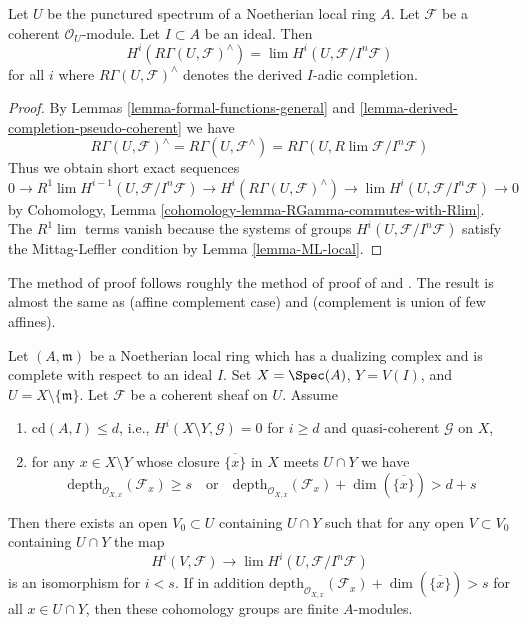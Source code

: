 \begin{lemma}
\label{lemma-compare-with-derived-completion}
Let $U$ be the punctured spectrum of a Noetherian local ring $A$.
Let $\mathcal{F}$ be a coherent $\mathcal{O}_U$-module.
Let $I \subset A$ be an ideal. Then
$$
H^i(R\Gamma(U, \mathcal{F})^\wedge) =
\lim H^i(U, \mathcal{F}/I^n\mathcal{F})
$$
for all $i$ where $R\Gamma(U, \mathcal{F})^\wedge$ denotes
the derived $I$-adic completion.
\end{lemma}

\begin{proof}
By Lemmas \ref{lemma-formal-functions-general} and
\ref{lemma-derived-completion-pseudo-coherent} we have
$$
R\Gamma(U, \mathcal{F})^\wedge =
R\Gamma(U, \mathcal{F}^\wedge) =
R\Gamma(U, R\lim \mathcal{F}/I^n\mathcal{F})
$$
Thus we obtain short exact sequences
$$
0 \to R^1\lim H^{i - 1}(U, \mathcal{F}/I^n\mathcal{F}) \to
H^i(R\Gamma(U, \mathcal{F})^\wedge) \to
\lim H^i(U, \mathcal{F}/I^n\mathcal{F}) \to 0
$$
by Cohomology, Lemma \ref{cohomology-lemma-RGamma-commutes-with-Rlim}.
The $R^1\lim$ terms vanish because the systems of groups
$H^i(U, \mathcal{F}/I^n\mathcal{F})$ satisfy the Mittag-Leffler condition
by Lemma \ref{lemma-ML-local}.
\end{proof}

\begin{theorem}
\label{theorem-algebraization-formal-sections}
\begin{reference}
The method of proof follows roughly the method of
proof of \cite[Theorem 1]{Faltings-algebraisation}
and \cite[Satz 2]{Faltings-uber}.
The result is almost the same as
\cite[Theorem 1.1]{MRaynaud-paper} (affine complement case) and
\cite[Theorem 3.9]{MRaynaud-book} (complement is union of few affines).
\end{reference}
Let $(A, \mathfrak m)$ be a Noetherian local ring which has a
dualizing complex and is complete with respect to an ideal $I$.
Set $X = \Spec(A)$, $Y = V(I)$, and $U = X \setminus \{\mathfrak m\}$.
Let $\mathcal{F}$ be a coherent sheaf on $U$.
Assume
\begin{enumerate}
\item $\text{cd}(A, I) \leq d$, i.e.,
$H^i(X \setminus Y, \mathcal{G}) = 0$ for $i \geq d$ and
quasi-coherent $\mathcal{G}$ on $X$,
\item for any $x \in X \setminus Y$ whose closure $\overline{\{x\}}$
in $X$ meets $U \cap Y$ we have
$$
\text{depth}_{\mathcal{O}_{X, x}}(\mathcal{F}_x) \geq s
\quad\text{or}\quad
\text{depth}_{\mathcal{O}_{X, x}}(\mathcal{F}_x)
+ \dim(\overline{\{x\}}) > d + s
$$
\end{enumerate}
Then there exists an open $V_0 \subset U$ containing $U \cap Y$
such that for any open $V \subset V_0$ containing $U \cap Y$
the map
$$
H^i(V, \mathcal{F}) \to \lim H^i(U, \mathcal{F}/I^n\mathcal{F})
$$
is an isomorphism for $i < s$. If in addition
$
\text{depth}_{\mathcal{O}_{X, x}}(\mathcal{F}_x) +
\dim(\overline{\{x\}}) > s
$
for all $x \in U \cap Y$, then these cohomology groups are finite $A$-modules.
\end{theorem}

